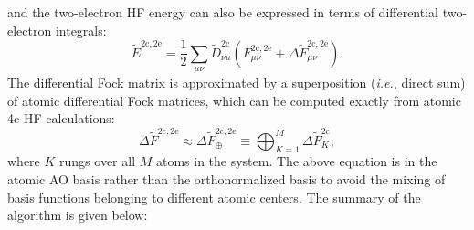\documentclass{article}
\begin{document}
and the two-electron HF energy can also be expressed in terms of differential two-electron integrals:
\begin{equation}
\tilde{E}^{\mathrm{2c,2e}}=\frac{1}{2}\sum_{\mu\nu}\tilde{D}^{\mathrm{2c}}_{\nu\mu}\left( {F}^{\mathrm{2c,2e}}_{\mu\nu}+\Delta\tilde{F}^{\mathrm{2c,2e}}_{\mu\nu} \right).
\end{equation}
The differential Fock matrix is approximated by a superposition (\textit{i.e.}, direct sum) of atomic differential Fock matrices, which can be computed exactly from atomic 4c HF calculations:
\begin{equation}
\Delta\tilde{F}^{\mathrm{2c,2e}}\approx\Delta\tilde{F}_{\oplus}^{\mathrm{2c,2e}}\equiv\bigoplus_{K=1}^M\Delta\tilde{F}^{\mathrm{2c}}_K,
\end{equation}
where $K$ rungs over all $M$ atoms in the system. The above equation is in the atomic AO basis rather than the orthonormalized basis to avoid the mixing of basis functions belonging to different atomic centers. The summary of the algorithm is given below:
\end{document}
